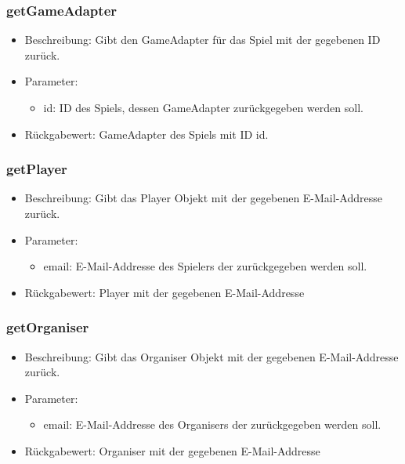 \documentclass[a4paper]{scrreprt}
\begin{document}
    \subsubsection{getGameAdapter}
    \begin{itemize}
        \item Beschreibung: Gibt den GameAdapter für das Spiel mit der gegebenen ID zurück.
        \item Parameter:
        \begin{itemize}
            \item id: ID des Spiels, dessen GameAdapter zurückgegeben werden soll.
        \end{itemize}
        \item Rückgabewert: GameAdapter des Spiels mit ID id.
    \end{itemize}

    \subsubsection{getPlayer}
    \begin{itemize}
        \item Beschreibung: Gibt das Player Objekt mit der gegebenen E-Mail-Addresse zurück.
        \item Parameter:
        \begin{itemize}
            \item email: E-Mail-Addresse des Spielers der zurückgegeben werden soll.
        \end{itemize}
        \item Rückgabewert: Player mit der gegebenen E-Mail-Addresse
    \end{itemize}


    \subsubsection{getOrganiser}
    \begin{itemize}
        \item Beschreibung: Gibt das Organiser Objekt mit der gegebenen E-Mail-Addresse zurück.
        \item Parameter:
        \begin{itemize}
            \item email: E-Mail-Addresse des Organisers der zurückgegeben werden soll.
        \end{itemize}
        \item Rückgabewert: Organiser mit der gegebenen E-Mail-Addresse
    \end{itemize}
\end{document}
